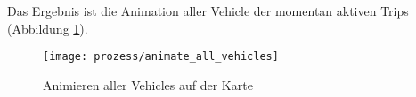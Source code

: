   Das Ergebnis ist die Animation aller Vehicle der momentan aktiven Trips (Abbildung \ref{fig:prozess/animate_all_vehicles}).

  \begin{figure}[htbp]
    \begin{center}
      \texttt{[image: prozess/animate\_all\_vehicles]}
      \caption{Animieren aller Vehicles auf der Karte}
      \label{fig:prozess/animate_all_vehicles}
    \end{center}
  \end{figure}
  
  
  
